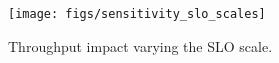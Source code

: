 \begin{figure}[!t]
    \centering
    \texttt{[image: figs/sensitivity\_slo\_scales]}
    \caption{Throughput impact varying the SLO scale.}
    \vspace{-10pt}
    \label{fig:eval:sensitivity-slo-scale}
\end{figure}